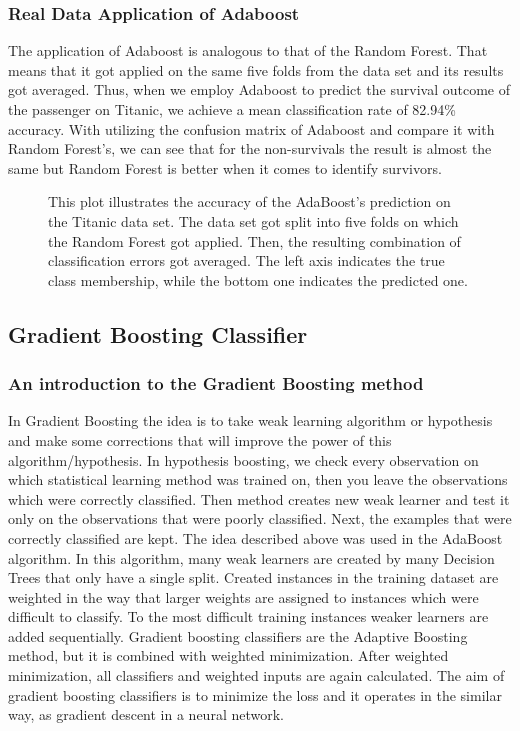 \subsubsection{Real Data Application of Adaboost}
The application of Adaboost is analogous to that of the Random Forest. 
That means that it got applied on the same five folds from the data set and its results got averaged.
Thus, when we employ Adaboost to predict the survival outcome of the passenger on Titanic, 
we achieve a mean classification rate of 82.94\% accuracy. With utilizing the confusion matrix of Adaboost 
and compare it with Random Forest's, we can see that for the non-survivals the result is almost the same 
but Random Forest is better when it comes to identify survivors.

\begin{figure}[H]
    \captionsetup{format=plain}
    \caption
        {This plot illustrates the accuracy of the AdaBoost's prediction on the Titanic data set.
        The data set got split into five folds on which the Random Forest got applied. 
        Then, the resulting combination of classification errors got averaged.
        The left axis indicates the true class membership, while the bottom one indicates the predicted one.
        }
    \label{fig:confusion_matrix_adaboost}
\end{figure}


\subsection{Gradient Boosting Classifier}
\label{sec:gradient_boosting}

\subsubsection{An introduction to the Gradient Boosting method}
In Gradient Boosting the idea is to take weak learning algorithm or hypothesis and make some corrections that will improve the power of this algorithm/hypothesis. In hypothesis boosting, we check every observation on which statistical learning method was trained on, then you leave the observations which were correctly classified. Then method creates new weak learner and test it only on the observations that were poorly classified. Next, the examples that were correctly classified are kept.
The idea described above was used in the AdaBoost algorithm. In this algorithm, many weak learners are created by many Decision Trees that only have a single split. Created instances in the training dataset are weighted in the way that larger weights are assigned to instances which were difficult to classify. To the most difficult training instances weaker learners are added sequentially.
Gradient boosting classifiers are the Adaptive Boosting method, but it is combined with weighted minimization. After weighted minimization, all classifiers and weighted inputs are again calculated. The aim of gradient boosting classifiers is to minimize the loss and it operates in the similar way, as gradient descent in a neural network.

